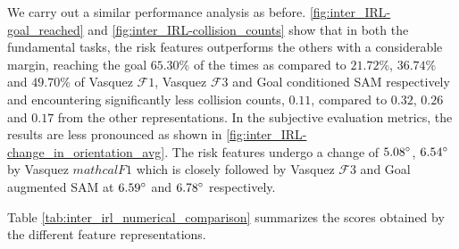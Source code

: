 We carry out a similar performance analysis as before. \autoref{fig:inter_IRL-goal_reached} and \autoref{fig:inter_IRL-collision_counts} show that in both the fundamental tasks, the risk features outperforms the others with a considerable margin, reaching the goal $65.30\%$ of the times as compared to $21.72\%$, $36.74\%$ and $49.70\%$ of Vasquez $\mathcal{F}1$, Vasquez $\mathcal{F}3$ and Goal conditioned SAM respectively and encountering significantly less collision counts, $0.11$, compared to $0.32$, $0.26$ and $0.17$ from the other  representations. In the subjective evaluation metrics, the results are less pronounced as shown in \autoref{fig:inter_IRL-change_in_orientation_avg}. The risk features undergo a change of $5.08\degree$, $6.54\degree$  by Vasquez $mathcal{F}1$ which is closely followed by Vasquez $\mathcal{F}3$ and Goal augmented SAM at $6.59\degree$ and $6.78\degree$ respectively. 
\par
{}%
Table \ref{tab:inter_irl_numerical_comparison} summarizes the scores obtained by the different feature representations.
